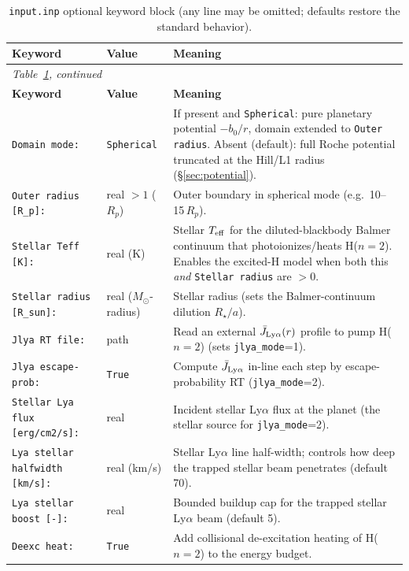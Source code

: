 \documentclass[english,a4paper]{kiseon_memo}
\newcommand{\rp}{$R_p$}
\newcommand{\msun}{$M_\odot$}
\begin{document}
\begin{longtable}{@{}p{}p{}p{}@{}}
\caption{\texttt{input.inp} optional keyword block (any line may be omitted;
defaults restore the standard behavior).}\label{tab:inp-opt}\\
\toprule
\textbf{Keyword} & \textbf{Value} & \textbf{Meaning} \\
\midrule
\endfirsthead
\multicolumn{3}{l}{\small\itshape Table~\ref{tab:inp-opt}, continued}\\
\toprule \textbf{Keyword} & \textbf{Value} & \textbf{Meaning} \\ \midrule
\endhead
\bottomrule
\endfoot
\texttt{Domain mode:} & \texttt{Spherical} & If present and \texttt{Spherical}:
  pure planetary potential $-b_0/r$, domain extended to \texttt{Outer radius}.
  Absent (default): full Roche potential truncated at the Hill/L1 radius
  (\S\ref{sec:potential}). \\
\texttt{Outer radius [R\_p]:} & real $>1$ (\rp) & Outer boundary in spherical
  mode (e.g.\ 10--15\,\rp). \\
\texttt{Stellar Teff [K]:} & real (K) & Stellar $T_{\rm eff}$ for the
  diluted-blackbody Balmer continuum that photoionizes/heats H($n{=}2$). Enables
  the excited-H model when both this \emph{and} \texttt{Stellar radius} are $>0$. \\
\texttt{Stellar radius [R\_sun]:} & real (\msun-radius) & Stellar radius (sets the
  Balmer-continuum dilution $R_\star/a$). \\
\texttt{Jlya RT file:} & path & Read an external $\bar J_{\rm Ly\alpha}(r)$ profile
  to pump H($n{=}2$) (sets \texttt{jlya\_mode}=1). \\
\texttt{Jlya escape-prob:} & \texttt{True} & Compute $\bar J_{\rm Ly\alpha}$
  in-line each step by escape-probability RT (\texttt{jlya\_mode}=2). \\
\texttt{Stellar Lya flux [erg/cm2/s]:} & real & Incident stellar Ly$\alpha$ flux
  at the planet (the stellar source for \texttt{jlya\_mode}=2). \\
\texttt{Lya stellar halfwidth [km/s]:} & real (km/s) & Stellar Ly$\alpha$ line
  half-width; controls how deep the trapped stellar beam penetrates (default 70). \\
\texttt{Lya stellar boost [-]:} & real & Bounded buildup cap for the trapped
  stellar Ly$\alpha$ beam (default 5). \\
\texttt{Deexc heat:} & \texttt{True} & Add collisional de-excitation heating of
  H($n{=}2$) to the energy budget. \\

\end{longtable}
\end{document}
